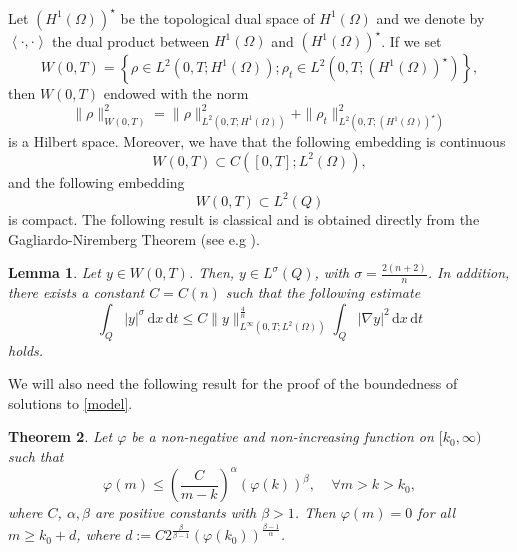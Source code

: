 \documentclass[reqno,twoside]{amsart}
\numberwithin{equation}{section}
\newtheorem{theorem}{Theorem}[section]
\newtheorem{lemma}[theorem]{Lemma}
\theoremstyle{definition}
\numberwithin{equation}{section}
\def \dq {\mathrm{d}x \, \mathrm{d}t}
\begin{document}
Let $(H^{1}(\Omega))^\star$ be the topological dual space of $H^1(\Omega)$ and we denote by $\left\langle \cdot,\cdot\right\rangle$ the dual product between $H^1(\Omega)$ and $(H^{1}(\Omega))^\star$.
If we set
\begin{equation}\label{defWTA}
	W(0,T)= \left\{\rho \in L^2(0,T;H^1(\Omega)); \rho_t\in L^2\left(0,T;(H^{1}(\Omega))^\star\right)\right\},
\end{equation}
then $W(0,T)$ endowed with the norm
\begin{equation}\label{}
	\|\rho\|^2_{	W(0,T)}=\|\rho\|^2_{L^2(0,T;H^1(\Omega))}+\|\rho_t\|^2_{L^2\left(0,T;(H^{1}(\Omega))^\star\right)}
\end{equation}
is a Hilbert space. Moreover, we have that the following embedding is continuous
\begin{equation}\label{contWTA}
	W(0,T)\subset C([0,T];L^2(\Omega)),
\end{equation}
and the following embedding
\begin{equation}\label{comp}
	W(0,T)\subset L^2(Q)
\end{equation}
is compact.
The following result is classical and is obtained directly  from the Gagliardo-Niremberg Theorem (see e.g \cite{ breitenbach2019, nirenberg2011}).
\begin{lemma}\label{lemmaimpt}
	Let $y\in W(0,T)$. Then, $y\in L^{\sigma}(Q)$, with $\sigma=\frac{2(n+2)}{n}$. In addition, there exists a constant $C=C(n)$ such that the following estimate
	\begin{equation}\label{ineq100}
		\int_Q|y|^\sigma\,\dq\leq C\|y\|^{\frac{4}{n}}_{L^\infty(0,T;L^{2}(\Omega))}\int_{Q}|\nabla y|^2\,\dq
	\end{equation}
	holds.
\end{lemma}
We will also need the following result for the proof of the boundedness of solutions to \eqref{model}.
\begin{theorem}\cite[Lemma 4.1.1]{wu2006}\label{thmimp}
	Let $\varphi$ be a non-negative and non-increasing function on $[k_0,\infty)$ such that
	\begin{equation}\label{ineq2}
		\varphi(m)\leq \left(\frac{C}{m-k}\right)^{\alpha}(\varphi(k))^{\beta},\;\;\;\; \forall m>k> k_0,	
	\end{equation}
	where $C$, $\alpha, \beta$ are positive constants with $\beta>1$. Then
	$\varphi(m)=0$ for all $m\geq k_0+d$, where $d:=C2^{\frac{\beta}{\beta-1}}(\varphi(k_0))^{\frac{\beta-1}{\alpha}}$.
\end{theorem}
\end{document}
